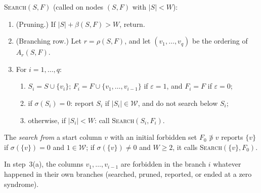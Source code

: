 \documentclass[11pt]{article}
\theoremstyle{definition}
\newcommand{\Wr}{\mathcal{W}}   %
\begin{document}
\medskip
\noindent\textup{\textsc{Search}}$(S,F)$ \quad (called on nodes $(S,F)$ with $|S|<W$):
\begin{enumerate}[label=\arabic*.,leftmargin=2.5em]
  \item (Pruning.) If $|S|+\beta(S,F)>W$, return.
  \item (Branching row.) Let $r=\rho(S,F)$, and let $(v_1,\dots,v_q)$ be the ordering of $A_r(S,F)$.
  \item For $i=1,\dots,q$:
  \begin{enumerate}[label=(\alph*)]
    \item $S_i=S\cup\{v_i\}$; $F_i=F\cup\{v_1,\dots,v_{i-1}\}$ if $\varepsilon=1$, and $F_i=F$ if $\varepsilon=0$;
    \item if $\sigma(S_i)=0$: report $S_i$ if $|S_i|\in\Wr$, and do not search below $S_i$;
    \item otherwise, if $|S_i|<W$: call \textup{\textsc{Search}}$(S_i,F_i)$.
  \end{enumerate}
\end{enumerate}
The \emph{search from} a start column $v$ with an initial forbidden set $F_0\not\ni v$ reports $\{v\}$ if
$\sigma(\{v\})=0$ and $1\in\Wr$; if $\sigma(\{v\})\neq0$ and $W\ge2$, it calls \textup{\textsc{Search}}$(\{v\},F_0)$.

In step~3(a), the columns $v_1,\dots,v_{i-1}$ are forbidden in the branch $i$ whatever happened in their own branches
(searched, pruned, reported, or ended at a zero syndrome).
\end{document}
